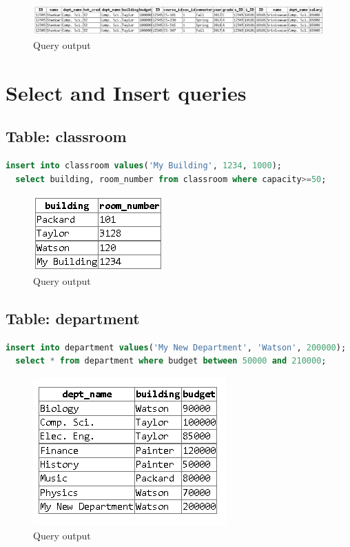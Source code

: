 \documentclass{article}
\begin{document}
\begin{figure}[!ht]
  \includegraphics[scale=0.61]{4.png}
  \caption{Query output}
\end{figure}




\section{Select and Insert queries}

\subsection{Table: classroom}
\begin{lstlisting}[language=sql]
  insert into classroom values('My Building', 1234, 1000);
  select building, room_number from classroom where capacity>=50;
\end{lstlisting}
\begin{figure}[!ht]
  \begin{center}
  \includegraphics[scale=1]{class.png}
  \caption{Query output}
  \end{center}
\end{figure}

\subsection{Table: department}
\begin{lstlisting}[language=sql]
  insert into department values('My New Department', 'Watson', 200000);
  select * from department where budget between 50000 and 210000;
\end{lstlisting}
\begin{figure}[!ht]
  \begin{center}
  \includegraphics[scale=1]{dep.png}
  \caption{Query output}
  \end{center}
\end{figure}
\end{document}
